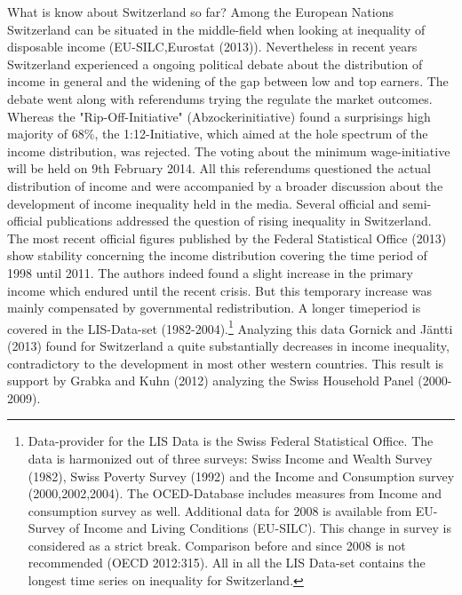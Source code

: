% 

What is know about Switzerland so far? Among the European Nations Switzerland can be situated in the middle-field when looking at inequality of disposable income (EU-SILC,Eurostat (2013)). Nevertheless in recent years Switzerland experienced  a ongoing political debate about the distribution of income in general and the widening of the gap between low and top earners. The debate went along with referendums trying the regulate the market outcomes. Whereas the "Rip-Off-Initiative" (Abzockerinitiative) found a surprisings high majority of 68\%, the 1:12-Initiative, which aimed at the hole spectrum of the income distribution, was rejected. The voting about the minimum wage-initiative will be held on 9th February 2014. All this referendums questioned the actual distribution of income and were accompanied by a broader discussion about the development of income inequality held in the media. Several official and semi-official publications addressed the question of rising inequality in Switzerland. \\



The most recent official figures published by the Federal Statistical Office (2013) show  stability concerning the income distribution covering the time period of 1998 until 2011. The authors indeed found a slight increase in the primary income which endured until the recent crisis. But this temporary increase was mainly compensated by governmental redistribution. A longer timeperiod is covered in the LIS-Data-set (1982-2004).\footnote{Data-provider for the LIS Data is the Swiss Federal Statistical Office. The data is harmonized out of three surveys: Swiss Income and Wealth Survey (1982), Swiss Poverty Survey (1992) and the Income and Consumption survey (2000,2002,2004). The OCED-Database includes measures from Income and consumption survey as well. Additional data for 2008 is available from EU-Survey of Income and Living Conditions (EU-SILC). This change in survey is considered as a strict break. Comparison before and since 2008 is not recommended (OECD 2012:315). All in all the LIS Data-set contains the longest time series on inequality for Switzerland.} Analyzing this data Gornick and Jäntti (2013) found for Switzerland a quite substantially decreases in income inequality, contradictory to the development in most other western countries. This result is support by Grabka and Kuhn (2012) analyzing the Swiss Household Panel (2000-2009). \\

